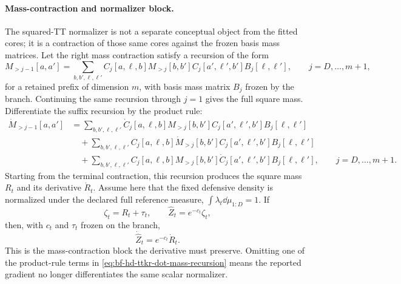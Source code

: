 \paragraph{Mass-contraction and normalizer block.}
The squared-TT normalizer is not a separate conceptual object from the fitted
cores; it is a contraction of those same cores against the frozen basis mass
matrices.  Let the right mass contraction satisfy a recursion of the form
\begin{equation}
  M_{>j-1}[a,a']=
  \sum_{b,b',\ell,\ell'}
  C_j[a,\ell,b]
  M_{>j}[b,b']
  C_j[a',\ell',b']
  B_j[\ell,\ell'],
  \qquad j=D,\ldots,m+1,
  \label{eq:bf-hd-ttkr-mass-recursion}
\end{equation}
for a retained prefix of dimension \(m\), with basis mass matrix \(B_j\) frozen
by the branch.  Continuing the same recursion through \(j=1\) gives the full
square mass.  Differentiate the suffix recursion by the product rule:
\begin{equation}
\begin{aligned}
  \dot M_{>j-1}[a,a']
  &=
  \sum_{b,b',\ell,\ell'}
  \dot C_j[a,\ell,b]
  M_{>j}[b,b']
  C_j[a',\ell',b']
  B_j[\ell,\ell']\\
  &\quad+
  \sum_{b,b',\ell,\ell'}
  C_j[a,\ell,b]
  \dot M_{>j}[b,b']
  C_j[a',\ell',b']
  B_j[\ell,\ell']\\
  &\quad+
  \sum_{b,b',\ell,\ell'}
  C_j[a,\ell,b]
  M_{>j}[b,b']
  \dot C_j[a',\ell',b']
  B_j[\ell,\ell'],
  \qquad j=D,\ldots,m+1.
\end{aligned}
  \label{eq:bf-hd-ttkr-dot-mass-recursion}
\end{equation}
Starting from the terminal contraction, this recursion produces the square mass
\(R_t\) and its derivative \(\dot R_t\).  Assume here that the fixed defensive
density is normalized under the declared full reference measure,
\(\int\lambda_t\dd\mu_{1:D}=1\).  If
\begin{equation}
  \zeta_t=R_t+\tau_t,
  \qquad
  \widehat Z_t=e^{-c_t}\zeta_t,
  \label{eq:bf-hd-ttkr-normalizer-block}
\end{equation}
then, with \(c_t\) and \(\tau_t\) frozen on the branch,
\begin{equation}
  \dot{\widehat Z}_t=e^{-c_t}\dot R_t.
  \label{eq:bf-hd-ttkr-dot-normalizer}
\end{equation}
This is the mass-contraction block the derivative must preserve.  Omitting one of
the product-rule terms in \eqref{eq:bf-hd-ttkr-dot-mass-recursion} means the
reported gradient no longer differentiates the same scalar normalizer.

